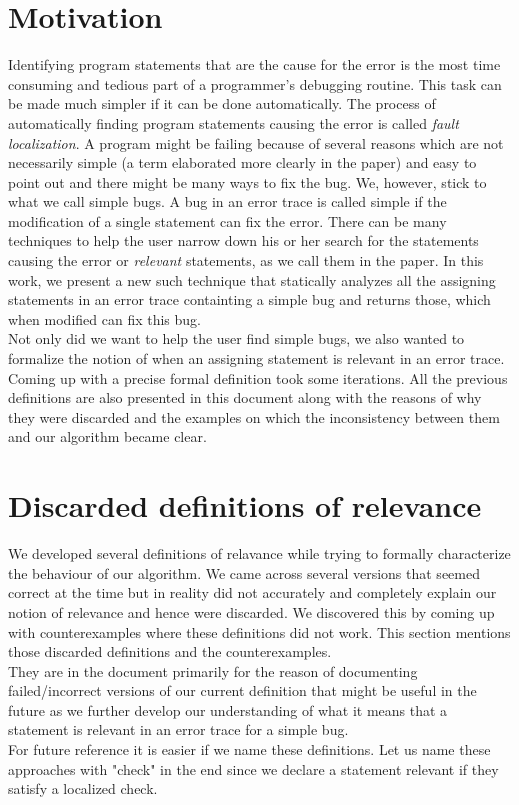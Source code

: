 \documentclass{article}
\begin{document}
\section{Motivation}
Identifying program statements that are the cause for the error is the most time consuming and tedious part of a programmer's debugging routine. This task can be made much simpler if it can be done automatically. The process of automatically finding program statements causing the error is called \textit{fault localization}. A program might be failing because of several reasons which are not necessarily simple (a term elaborated more clearly in the paper) and easy to point out and there might be many ways to fix the bug. We, however, stick to what we call simple bugs. A bug in an error trace is called simple if the modification of a single statement can fix the error. There can be many techniques to help the user narrow down his or her search for the statements  causing the error or \textit{relevant} statements, as we call them in the paper. In this work, we present a new such technique that statically analyzes all the assigning statements in an error trace containting a simple bug and returns those, which when modified can fix this bug.\\
Not only did we want to help the user find simple bugs, we also wanted to formalize the notion of when an assigning statement is relevant in an error trace.
Coming up with a precise formal definition took some iterations. All the previous definitions are also presented in this document along with the reasons of why they were discarded and the examples on which the inconsistency between them and our algorithm became clear.\\
\section{Discarded definitions of relevance}
We developed several definitions of relavance while trying to formally characterize the behaviour of our algorithm. We came across several versions that seemed correct at the time but in reality did not accurately and completely explain our notion of relevance and hence were discarded. We discovered this by coming up with counterexamples where these definitions did not work. This section mentions those discarded definitions and the counterexamples.\\ 
They are in the document primarily for the reason of documenting failed/incorrect versions of our current definition that might be useful in the future as we further develop our understanding of what it means that a statement is relevant in an error trace for a simple bug. \\
For future reference it is easier if we name these definitions. Let us name these approaches with "check" in the end since we declare a statement relevant if they satisfy a localized check. 
\end{document}
